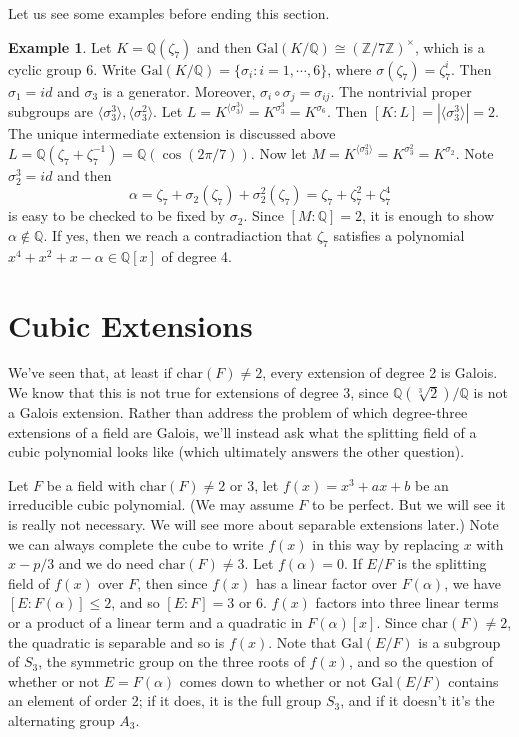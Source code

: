 \documentclass[12pt]{report}
\theoremstyle{definition}
\newtheorem{example}[theorem]{Example}
\newcommand{\charr}{\text{char}}
\newcommand{\Gal}{\text{Gal}}
\newcommand{\ZZ}{\mathbb{Z}}
\newcommand{\QQ}{\mathbb{Q}}
\begin{document}
Let us see some examples before ending this section.
\begin{example}
	Let $K=\QQ(\zeta_7)$ and then $\Gal(K/\QQ)\cong (\ZZ/7\ZZ)^\times$, which is a cyclic group 6. Write $\Gal(K/\QQ)=\{\sigma_i: i=1,\cdots,6\}$, where $\sigma(\zeta_7)=\zeta_7^i$. Then $\sigma_1=id$ and $\sigma_3$ is a generator. Moreover, $\sigma_i\circ\sigma_j=\sigma_{ij}$. The nontrivial proper subgroups are $\langle \sigma_3^3 \rangle, \langle \sigma_3^2 \rangle$. Let $L=K^{\langle \sigma_3^3 \rangle}=K^{\sigma_3^3}=K^{\sigma_6}$. Then $[K:L]=|\langle \sigma_3^3 \rangle|=2$. The unique intermediate extension is discussed above $L=\QQ(\zeta_7+\zeta_7^{-1})=\QQ(\cos(2\pi/7))$. Now let $M=K^{\langle \sigma_3^2 \rangle}=K^{\sigma_3^2}=K^{\sigma_2}$. Note $\sigma_2^3=id$ and then $$\alpha=\zeta_7+\sigma_2(\zeta_7)+\sigma_2^2(\zeta_7)=\zeta_7+\zeta_7^2+\zeta_7^4$$ is easy to be checked to be fixed by $\sigma_2$. Since $[M:\QQ]=2$, it is enough to show $\alpha\notin\QQ$. If yes, then we reach a contradiaction that $\zeta_7$ satisfies a polynomial $x^4+x^2+x-\alpha\in \QQ[x]$ of degree 4.
\end{example}

\section{Cubic Extensions}

We've seen that, at least if $\charr(F) \not= 2$, every extension of degree 2 is Galois. We know that this is not true for extensions of degree 3, since $\QQ(\sqrt[3]{2})/\QQ$ is not a Galois extension. Rather than address the problem of which degree-three extensions of a field are Galois, we'll instead ask what the splitting field of a cubic polynomial looks like (which ultimately answers the other question).


Let $F$ be a field with $\charr(F) \not= 2$ or 3, let $f(x) = x^3 + ax + b$ be an irreducible cubic polynomial. (We may assume $F$ to be perfect. But we will see it is really not necessary. We will see more about separable extensions later.) Note we can always complete the cube to write $f(x)$ in this way by replacing $x$ with $x-p/3$ and we do need $\charr(F)\not=3$. Let $f(\alpha) = 0$. If $E/F$ is the splitting field of $f(x)$ over $F$, then since $f(x)$ has a linear factor over $F(\alpha)$, we have $[E : F(\alpha)] \leq 2$, and so $[E : F] = 3$ or 6. $f(x)$ factors into three linear terms or a product of a linear term and a quadratic in $F(\alpha)[x]$. Since $\charr(F) \not= 2$, the quadratic is separable and so is $f(x)$. Note that $\Gal(E/F)$ is a subgroup of $S_3$, the symmetric group on the three roots of $f(x)$, and so the question of whether or not $E = F(\alpha)$ comes down to whether or not $\Gal(E/F)$ contains an element of order 2; if it does, it is the full group $S_3$, and if it doesn't it's the alternating group $A_3$.
\end{document}

